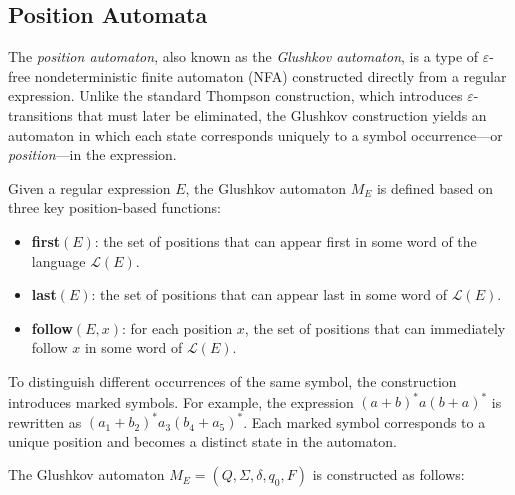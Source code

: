 \subsection{Position Automata}


The \emph{position automaton}, also known as the \emph{Glushkov automaton}, is a type of $\varepsilon$-free nondeterministic finite automaton (NFA) constructed directly from a regular expression. Unlike the standard Thompson construction, which introduces $\varepsilon$-transitions that must later be eliminated, the Glushkov construction yields an automaton in which each state corresponds uniquely to a symbol occurrence---or \emph{position}---in the expression. \cite{mesh-of-automata}

Given a regular expression $E$, the Glushkov automaton $M_E$ is defined based on three key position-based functions:

\begin{itemize}
    \item \textbf{first$(E)$}: the set of positions that can appear first in some word of the language $\mathcal{L}(E)$.
    \item \textbf{last$(E)$}: the set of positions that can appear last in some word of $\mathcal{L}(E)$.
    \item \textbf{follow$(E, x)$}: for each position $x$, the set of positions that can immediately follow $x$ in some word of $\mathcal{L}(E)$.
\end{itemize}

To distinguish different occurrences of the same symbol, the construction introduces marked symbols. For example, the expression $(a + b)^*a(b + a)^*$ is rewritten as $(a_1 + b_2)^*a_3(b_4 + a_5)^*$. Each marked symbol corresponds to a unique position and becomes a distinct state in the automaton.

The Glushkov automaton $M_E = (Q, \Sigma, \delta, q_0, F)$ is constructed as follows:


